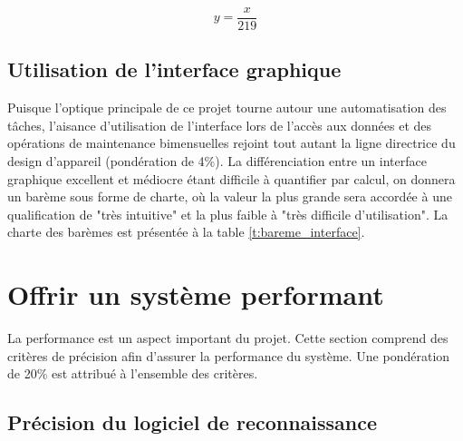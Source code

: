 \begin{equation}
    y = \frac{x}{219}
    \label{eq:bareme_gpu}
\end{equation}

\subsection{Utilisation de l'interface graphique}
\label{UIG}

\begin{table}[htb!]
   \footnotesize
   \centering
   \caption{Évaluation du barème de l'interface graphique}
   \label{t:bareme_interface}
\end{table}

Puisque l'optique principale de ce projet tourne autour une automatisation des tâches, l'aisance d'utilisation de l'interface lors de l'accès aux données et des opérations de maintenance bimensuelles rejoint tout autant la ligne directrice du design d'appareil (pondération de 4\%). La différenciation entre un interface graphique excellent et médiocre étant difficile à quantifier par calcul, on donnera un barème sous forme de charte, où la valeur la plus grande sera accordée à une qualification de "très intuitive" et la plus faible à "très difficile d'utilisation". La charte des barèmes est présentée à la table \ref{t:bareme_interface}. 


\section{Offrir un système performant}
La performance est un aspect important du projet. Cette section comprend des critères de précision afin d'assurer la performance du système. Une pondération de 20\% est attribué à l'ensemble des critères.

\subsection{Précision du logiciel de reconnaissance}
\label{Pldr}

